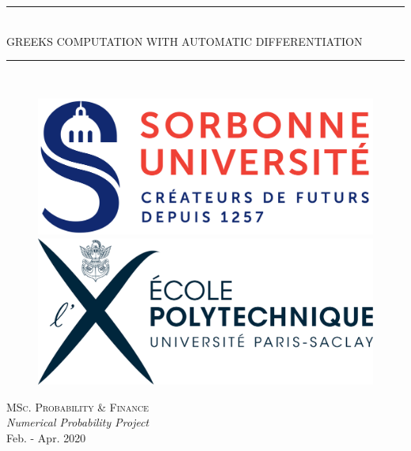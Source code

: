 \documentclass {article}
\newcommand{\HRule}{\rule{\linewidth}{0.5mm}}
\begin{document}
	\begin{titlepage}
					
		\begin{center}
			 	\HRule \\ [0.6cm]
    				\Huge {GREEKS COMPUTATION WITH AUTOMATIC DIFFERENTIATION} \\ [0.4cm] 
				\HRule \\[0.4cm]
		\end{center}
		
		\begin{figure}
			\begin{minipage}{0.4\textwidth}
				\includegraphics[scale = 0.09]{LogoSorbonne.png}
			\end{minipage}
			\hspace{19ex}
			\begin{minipage}{0.4\textwidth}
				\includegraphics[scale = 0.7]{LogoX.png}				
			 \end{minipage}
		\end{figure}

		\begin{center}
			\Huge{\textsc{MSc. Probability \& Finance} \\
			\Huge{\textit{Numerical Probability Project}}} \\
			\bigbreak
			\LARGE{Feb. - Apr. 2020}
		\end{center}
		

\end{titlepage}
\end{document}
